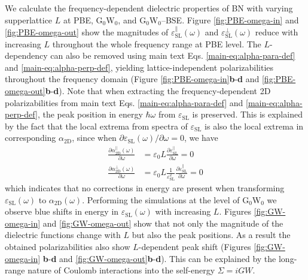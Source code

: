 \documentclass[manuscript=suppinfo,email=true,hyperref=true,keywords=false]{achemso}
\begin{document}
We calculate the frequency-dependent dielectric properties of BN with
varying supperlattice $L$ at PBE, G$_{0}$W$_{0}$, and G$_{0}$W$_{0}$--BSE. 
Figure \ref{fig:PBE-omega-in} and \ref{fig:PBE-omega-out} show the
magnitudes of $\varepsilon_{\mathrm{SL}}^{\parallel}(\omega)$ and
$\varepsilon_{\mathrm{SL}}^{\perp}(\omega)$ reduce with increasing $L$
throughout the whole frequency range at PBE level. The $L$-dependency can also be
removed using main text Eqs. \ref{main-eq:alpha-para-def} and
\ref{main-eq:alpha-perp-def}, yielding lattice-independent
polarizabilities throughout the frequency domain (Figure \ref{fig:PBE-omega-in}{\bf b}-{\bf d} and \ref{fig:PBE-omega-out}{\bf b}-{\bf d}). 
%
Note that when extracting the frequency-dependent 2D polarizabilities
from main text Eqs. \ref{main-eq:alpha-para-def} and
\ref{main-eq:alpha-perp-def}, the peak position in energy
$\hbar \omega$ from $\varepsilon_{\mathrm{SL}}$ is preserved. This is
explained by the fact that the local extrema from spectra of
$\varepsilon_{\mathrm{SL}}$ is also the local extrema in corresponding
$\alpha_{\mathrm{2D}}$, since when
$\partial \varepsilon_{\mathrm{SL}}(\omega) / \partial \omega = 0 $,
we have
\begin{subequations}
\begin{eqnarray}
  \label{eq:extrema-para}
  \frac{\partial \alpha_{\mathrm{2D}}^{\parallel}(\omega)}{\partial \omega}
  &= \varepsilon_{0}L {\displaystyle \frac{\partial \varepsilon_{\mathrm{SL}}^{\parallel}}{\partial \omega}} = 0   \\
  \label{eq:extrema-perp}
  \frac{\partial \alpha_{\mathrm{2D}}^{\perp}(\omega)}{\partial \omega}
  &= \varepsilon_{0}L {\displaystyle \frac{1}{\varepsilon_{\mathrm{SL}}^{2}}\frac{\partial \varepsilon_{\mathrm{SL}}^{\parallel}}{\partial \omega}} = 0
\end{eqnarray}
\end{subequations}
which indicates that no corrections in energy are present 
when transforming
$\varepsilon_{\mathrm{SL}}(\omega)$ to $\alpha_{\mathrm{2D}}(\omega)$.
Performing the simulations at the level of G$_{0}$W$_{0}$
we observe blue shifts in energy in $\varepsilon_{\mathrm{SL}}(\omega)$ 
with increasing $L$. Figures \ref{fig:GW-omega-in} and
\ref{fig:GW-omega-out} show that not only the magnitude of the dielectric
functions change with $L$ but also the peak positions. As a result
the obtained polarizabilities also show $L$-dependent peak 
shift (Figures \ref{fig:GW-omega-in} {\bf b}-{\bf d} and
\ref{fig:GW-omega-out}{\bf b}-{\bf d}). This
can be explained by the long-range nature of Coulomb interactions into the self-energy 
$\Sigma=iGW$. 
\end{document}

